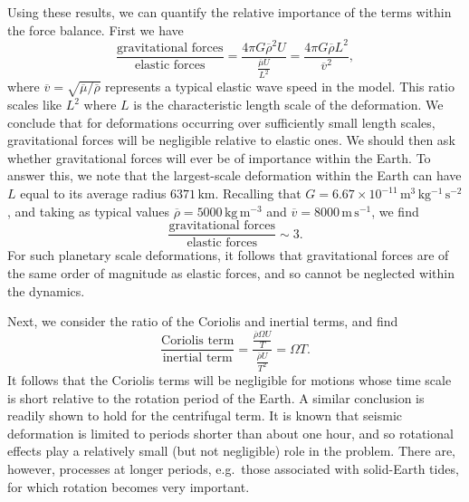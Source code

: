 Using these results, we can quantify the relative importance of the terms within the force balance. First we have
\begin{equation}
\frac{\text{gravitational forces}}{\text{elastic forces}}=\frac{4\pi G\overline{\rho}^{2}U}
{\frac{\overline{\mu} U}{L^{2}}}=\frac{4\pi G\overline{\rho}L^{2}}{\overline{v}^{2}},
\label{eq:54}
\end{equation}
where $\overline{v}=\sqrt{\overline{\mu}/\overline{\rho}}$ represents a typical elastic wave speed in the model. 
This ratio scales like $L^{2}$ where $L$ is the characteristic length scale of the deformation. We conclude that 
for deformations occurring over sufficiently small length scales, gravitational forces will be negligible relative 
to elastic ones. We should then ask whether gravitational forces will ever be of importance within the Earth. To 
answer this, we note that the largest-scale deformation within the Earth can have $L$ equal to its average radius $6371\,\mathrm{km}$.
Recalling that $G=6.67\times10^{-11}\,\mathrm{m^{3}\,kg^{-1}\,s^{-2}}$, and taking as typical values $\overline{\rho}=5000\,
\mathrm{kg\,m^{-3}}$ and $\overline{v}=8000\,\mathrm{m\,s^{-1}}$, we find
\begin{equation}
\frac{\text{gravitational forces}}{\text{elastic forces}}\sim3.
\label{eq:55}
\end{equation}
For such planetary scale deformations, it follows that gravitational forces are of the same order of magnitude as elastic forces, 
and so cannot be neglected within the dynamics. 

Next, we consider the ratio of the Coriolis and inertial terms, and find
\begin{equation}
\frac{\text{Coriolis term}}{\text{inertial term}}=\frac{\frac{\overline{\rho}\Omega U}{T}}{\frac{\overline{\rho}U}{T^{2}}}=\Omega T.
\label{eq:56}
\end{equation}
It follows that the Coriolis terms will be negligible for motions whose time scale is short relative to the rotation period 
of the Earth. A similar conclusion is readily shown to hold for the centrifugal term. It is known that seismic deformation 
is limited to periods shorter than about one hour, and so rotational effects play a relatively small (but not negligible) 
role in the problem. There are, however, processes at longer periods, e.g.\ those associated with solid-Earth tides, for which 
rotation becomes very important.

